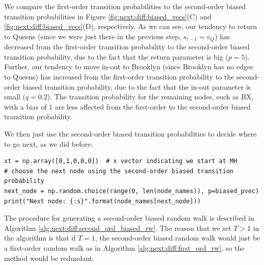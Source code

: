 We compare the first-order transition probabilities to the second-order biased transition probabilities in Figure \ref{fig:next:diff:biased_vecs}(C) and \ref{fig:next:diff:biased_vecs}(D), respectively. As we can see, our tendency to return to Queens (since we were just there in the previous step, $s_{t-1} = v_{Q}$) has decreased from the first-order transition probability to the second-order biased transition probability, due to the fact that the return parameter is big ($p = 5$). Further, our tendency to move in-out to Brooklyn (since Brooklyn has no edges to Queens) has increased from the first-order transition probability to the second-order biased transition probability, due to the fact that the in-out parameter is small ($q = 0.2$). The transition probability for the remaining nodes, such as BX, with a bias of $1$ are less affected from the first-order to the second-order biased transition probability.

We then just use the second-order biased transition probabilities to decide where to go next, as we did before:

\begin{lstlisting}[style=python]
xt = np.array([0,1,0,0,0])  # x vector indicating we start at MH
# choose the next node using the second-order biased transition probability
next_node = np.random.choice(range(0, len(node_names)), p=biased_pvec)
print("Next node: {:s}".format(node_names[next_node]))
\end{lstlisting}

The procedure for generating a second-order biased random walk is described in Algorithm \ref{alg:next:diff:second_ord_biased_rw}. The reason that we set $T > 1$ in the algorithm is that if $T = 1$, the second-order biased random walk would just be a first-order random walk as in Algorithm \ref{alg:next:diff:first_ord_rw}, so the method would be redundant. 


